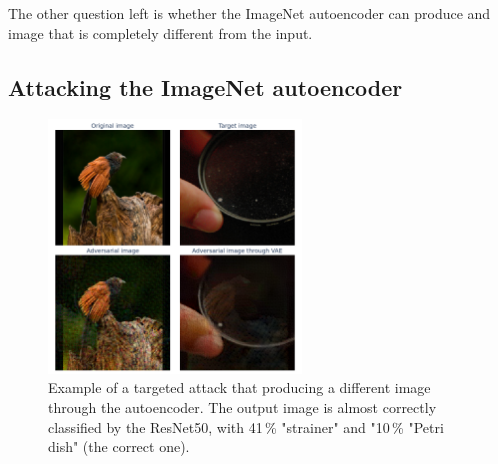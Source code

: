 \documentclass[]{scrarticle}
\begin{document}
The other question left is whether the ImageNet autoencoder can produce
and image that is completely different from the input.

\subsection{Attacking the ImageNet autoencoder}

\begin{figure}[h]
  \centering
  \includegraphics[width=0.6\textwidth]{../images/ae_targeted_attack_example.png}
  \caption{
    Example of a targeted attack that producing a different image
    through the autoencoder.
    The output image is almost correctly classified by the ResNet50,
    with 41\,\% "strainer" and "10\,\% "Petri dish" (the correct one).
  }
  \label{fig:ae_targeted_attack_example}
\end{figure}
\end{document}
